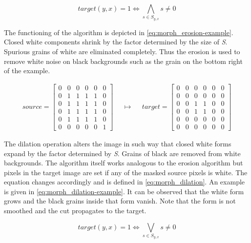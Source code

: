 \documentclass{report}
\begin{document}
\begin{equation}\label{eq:morph_erosion}
  target(y, x) = 1 \iff \bigwedge_{s \in S_{y, x}} s \neq 0
\end{equation}

The functioning of the algorithm is depicted in
\ref{eq:morph_erosion-example}. Closed white components shrink by the
factor determined by the size of \textit{S}. Spurious grains of white
are eliminated completely. Thus the erosion is used to remove white
noise on black backgrounds such as the grain on the bottom right of
the example.

\begin{align}\label{eq:morph_erosion-example}
  source = \begin{bmatrix}
    0 & 0 & 0 & 0 & 0 & 0 \\
    0 & 1 & 1 & 1 & 1 & 0 \\
    0 & 1 & 1 & 1 & 1 & 0 \\
    0 & 1 & 1 & 1 & 1 & 0 \\
    0 & 1 & 1 & 1 & 1 & 0 \\
    0 & 0 & 0 & 0 & 0 & 1
  \end{bmatrix}
  & &
  \mapsto
  & &
  target = \begin{bmatrix}
    0 & 0 & 0 & 0 & 0 & 0 \\
    0 & 0 & 0 & 0 & 0 & 0 \\
    0 & 0 & 1 & 1 & 0 & 0 \\
    0 & 0 & 1 & 1 & 0 & 0 \\
    0 & 0 & 0 & 0 & 0 & 0 \\
    0 & 0 & 0 & 0 & 0 & 0
  \end{bmatrix}
\end{align}

The dilation operation alters the image in such way that closed white
forms expand by the factor determined by \textit{S}. Grains of black
are removed from white backgrounds. The algorithm itself works
analogous to the erosion algorithm but pixels in the target image are
set if any of the masked source pixels is white. The equation changes
accordingly and is defined in \ref{eq:morph_dilation}. An example is
given in \ref{eq:morph_dilation-example}. It can be observed that the
white form grows and the black grains inside that form vanish. Note
that the form is not smoothed and the cut propagates to the target.

\begin{equation}\label{eq:morph_dilation}
  target(y, x) = 1 \iff \bigvee_{s \in S_{y, x}} s \neq 0
\end{equation}
\end{document}
